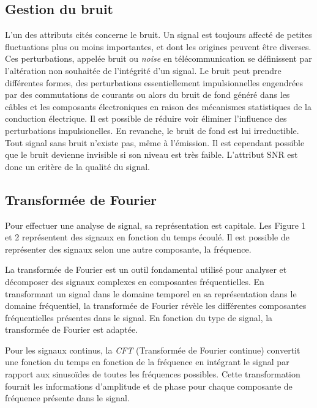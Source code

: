 \subsection{Gestion du bruit}

L'un des attributs cités concerne le bruit. Un signal est toujours affecté de petites fluctuations plus ou moins importantes, et dont les origines peuvent être diverses. Ces perturbations, appelée bruit ou \textit{noise} en télécommunication se définissent par l'altération non souhaitée de l'intégrité d'un signal. Le bruit peut prendre différentes formes, des perturbations essentiellement impulsionnelles engendrées par des commutations de courants ou alors du bruit de fond généré dans les câbles et les composants électroniques en raison
des mécanismes statistiques de la conduction électrique. Il est possible de réduire voir éliminer l'influence des perturbations impulsionelles. En revanche, le bruit de fond est lui irreductible. Tout signal sans bruit n'existe pas, même à l'émission. Il est cependant possible que le bruit devienne invisible si son niveau est très faible. L'attribut SNR est donc un critère de la qualité du signal.


\subsection{Transformée de Fourier}

Pour effectuer une analyse de signal, sa représentation est capitale. Les Figure 1 et 2 représentent des signaux en fonction du temps écoulé. Il est possible de représenter des signaux selon une autre composante, la fréquence.

\vspace{0.1cm}

La transformée de Fourier est un outil fondamental utilisé pour analyser et décomposer des signaux complexes en composantes fréquentielles. En transformant un signal dans le domaine temporel en sa représentation dans le domaine fréquentiel, la transformée de Fourier révèle les différentes composantes fréquentielles présentes dans le signal. En fonction du type de signal, la transformée de Fourier est adaptée.

\vspace{0.1cm}

Pour les signaux continus, la \textit{CFT} (Transformée de Fourier continue) convertit une fonction du temps en fonction de la fréquence en intégrant le signal par rapport aux sinusoïdes de toutes les fréquences possibles. Cette transformation fournit les informations d'amplitude et de phase pour chaque composante de fréquence présente dans le signal.

